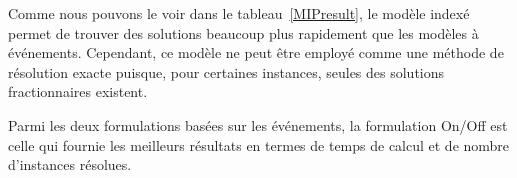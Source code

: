 Comme nous pouvons le voir dans le tableau~\ref{MIPresult}, le
modèle indexé permet de trouver des solutions beaucoup plus rapidement
que les modèles à événements. Cependant, ce modèle ne peut être
employé comme une méthode de résolution exacte  puisque, pour
certaines instances, seules des solutions fractionnaires existent. 

Parmi les deux formulations basées sur les événements, la formulation
On/Off est celle qui fournie les meilleurs résultats en termes de
temps de calcul et de nombre d'instances résolues. 
